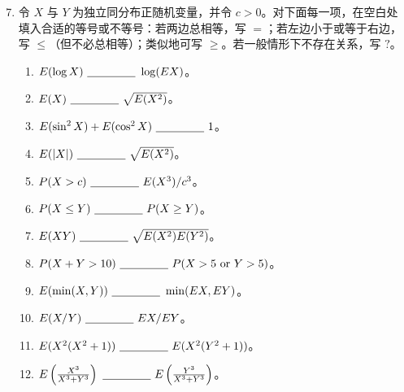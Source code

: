 \documentclass[UTF8,12pt,a4paper,fontset=fandol]{ctexart}
\begin{document}
\begin{enumerate}
  \setcounter{enumi}{6}
  \item 令 $X$ 与 $Y$ 为独立同分布正随机变量，并令 $c>0$。对下面每一项，在空白处填入合适的等号或不等号：若两边总相等，写 $=$；若左边小于或等于右边，写 $\le$（但不必总相等）；类似地可写 $\ge$。若一般情形下不存在关系，写 $?$。
  \begin{enumerate}
    \item $E(\log X)\ \underline{\hspace{1.5cm}}\ \log(EX)$。
    \item $E(X)\ \underline{\hspace{1.5cm}}\ \sqrt{E(X^2)}$。
    \item $E(\sin^2 X)+E(\cos^2 X)\ \underline{\hspace{1.5cm}}\ 1$。
    \item $E(|X|)\ \underline{\hspace{1.5cm}}\ \sqrt{E(X^2)}$。
    \item $P(X>c)\ \underline{\hspace{1.5cm}}\ E(X^3)/c^3$。
    \item $P(X\le Y)\ \underline{\hspace{1.5cm}}\ P(X\ge Y)$。
    \item $E(XY)\ \underline{\hspace{1.5cm}}\ \sqrt{E(X^2)E(Y^2)}$。
    \item $P(X+Y>10)\ \underline{\hspace{1.5cm}}\ P(X>5\text{ or }Y>5)$。
    \item $E(\min(X,Y))\ \underline{\hspace{1.5cm}}\ \min(EX,EY)$。
    \item $E(X/Y)\ \underline{\hspace{1.5cm}}\ EX/EY$。
    \item $E(X^2(X^2+1))\ \underline{\hspace{1.5cm}}\ E(X^2(Y^2+1))$。
    \item $E\left(\frac{X^3}{X^3+Y^3}\right)\ \underline{\hspace{1.5cm}}\ E\left(\frac{Y^3}{X^3+Y^3}\right)$。
  \end{enumerate}


\end{enumerate}
\end{document}
